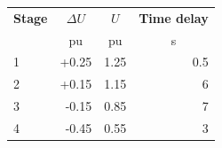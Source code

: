 \begin{tabularx}{\linewidth}{@{}l r r r@{}}
\toprule
\textbf{Stage} & \multicolumn{1}{c}{\textbf{$\Delta U$}} & \multicolumn{1}{c}{\textbf{$U$}} & \multicolumn{1}{c}{\textbf{Time delay}} \\
 & \multicolumn{1}{c}{pu} & \multicolumn{1}{c}{pu} & \multicolumn{1}{c}{s} \\
\midrule
1 & +0.25 & 1.25 & 0.5 \\
2 & +0.15 & 1.15 & 6 \\
3 & -0.15 & 0.85 & 7 \\
4 & -0.45 & 0.55 & 3 \\
\bottomrule
\end{tabularx}
